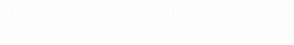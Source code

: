 \begin{titlepage}
  \newcommand{\BBp}{\mathcal{B}\left(\Bergman\left(\Pi\right)\right)}
 \newcommand{\BH}{\mathcal{B}(\mathfrak{H})}
 \newcommand{\KH}{\mathcal{K}(\mathfrak{H})}
 \renewcommand{\ker}{\operatorname{ker}}
\newcommand{\Rang}{\operatorname{Rang}}
 \newcommand{\Real}{\mathbb{R}}
 \newcommand{\Entero}{\mathbb{Z}}
 \newcommand{\Complex}{\mathbb{C}}
 \newcommand{\Field}{\mathbb{F}}
\newcommand{\F}{\operatorname{F}}
 \newcommand{\RPlus}{\Real^{+}}
 \newcommand{\Polar}{\mathcal{P}_{\s}}
 \newcommand{\Poly}{\mathcal{P}(E)}
 \newcommand{\EssD}{\mathcal{D}}
 \newcommand{\Lpi}{L_{\infty}(0,\pi)}
 \newcommand{\Ele}{L_{2}}
 \newcommand{\Bergman}{\mathcal{A}^{2}}
 \newcommand{\States}{\mathcal{T}}
 \newcommand{\abs}[1]{\left\vert#1\right\vert}
 \newcommand{\set}[1]{\left\{#1\right\}}
 \newcommand{\seq}[1]{\left<#1\right>}
 \newcommand{\norm}[1]{\left\Vert#1\right\Vert}
 \newcommand{\essnorm}[1]{\norm{#1}_{\ess}}

\pagecolor{white}
\BgThispage
{}
\vspace*{-1.1cm}
\noindent
\def\titulo#1{\section{#1}}
\section{\bf\large\textcolor{white}{Diferenciabilidad de funciones reales y complejas}}
\vspace*{2cm}\par
\noindent


\end{titlepage}
